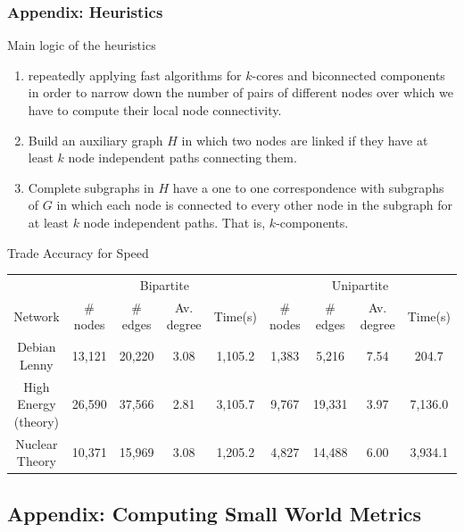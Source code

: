 \documentclass[ignorenonframetext,red,8pt,notes=hide]{beamer}
\begin{document}
\begin{frame}
\frametitle{Appendix: Heuristics}

\begin{block}{Main logic of the heuristics}

\begin{enumerate}

\item repeatedly applying fast algorithms for $k$-cores \citep{batagelj:2011} and biconnected components \citep{tarjan:1972} in order to narrow down the number of pairs of different nodes over which we have to compute their local node connectivity.

\item Build an auxiliary graph $H$ in which two nodes are linked if they have at least $k$ node independent paths connecting them.

\item Complete subgraphs in $H$ have a one to one correspondence with subgraphs of $G$ in which each node is connected to every other node in the subgraph for at least $k$ node independent paths. That is, $k$-components.

\end{enumerate}
\end{block}

\pause

\begin{block}{Trade Accuracy for Speed}
\begin{tiny}
\begin{tabular}{|c|c|c|c|c|c|c|c|c|}
\hline
&\multicolumn{4}{|c|}{Bipartite}&\multicolumn{4}{|c|}{Unipartite}\\
Network&\# nodes&\# edges&Av. degree&Time(s)&\# nodes&\# edges&Av. degree&Time(s)\\
\hline
Debian Lenny&13,121&20,220&3.08&1,105.2&1,383&5,216&7.54&204.7\\
High Energy (theory)&26,590&37,566&2.81&3,105.7&9,767&19,331&3.97&7,136.0\\
Nuclear Theory&10,371&15,969&3.08&1,205.2&4,827&14,488&6.00&3,934.1\\
\hline
\end{tabular}
\end{tiny}
\end{block}

\end{frame}

\subsection{Appendix: Computing Small World Metrics}
\end{document}
